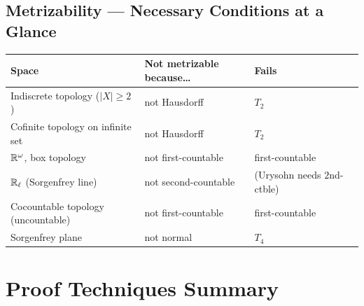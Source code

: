 \documentclass{article}
\begin{document}
\subsection{Metrizability --- Necessary Conditions at a Glance}

\begin{center}
  \begin{tabular}{@{}llll@{}}
    \hline
    \textbf{Space} & \textbf{Not metrizable because\ldots} & \textbf{Fails} \\
    \hline
    Indiscrete topology ($|X|\ge2$) & not Hausdorff & $T_2$ \\
    Cofinite topology on infinite set & not Hausdorff & $T_2$ \\
    $\mathbb{R}^\omega$, box topology & not first-countable & first-countable \\
    $\mathbb{R}_\ell$ (Sorgenfrey line) & not second-countable\phantom{X} & (Urysohn needs $2$nd-ctble) \\
    Cocountable topology (uncountable) & not first-countable & first-countable \\
    Sorgenfrey plane & not normal & $T_4$ \\
    \hline
  \end{tabular}
\end{center}

\section{Proof Techniques Summary}
\end{document}

